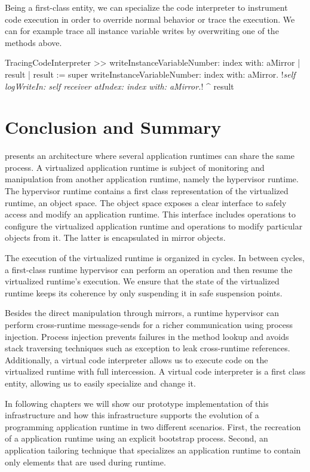 Being a first-class entity, we can specialize the code interpreter to instrument code execution in order to override normal behavior or trace the execution. We can for example trace all instance variable writes by overwriting one of the methods above.

\begin{code}
TracingCodeInterpreter >> writeInstanceVariableNumber: index with: aMirror
    | result |
    result := super writeInstanceVariableNumber: index with: aMirror.
    !\emph{self logWriteIn: self receiver atIndex: index with: aMirror.}!
    ^ result
\end{code}

\section{Conclusion and Summary}

\Vtt presents an architecture where several application runtimes can share the same process. A virtualized application runtime is subject of monitoring and manipulation from another application runtime, namely the hypervisor runtime. The hypervisor runtime contains a first class representation of the virtualized runtime, an object space. The object space exposes a clear interface to safely access and modify an application runtime. This interface includes operations to configure the virtualized application runtime and operations to modify particular objects from it. The latter is encapsulated in mirror objects.

The execution of the virtualized runtime is organized in cycles. In between cycles, a first-class runtime hypervisor can perform an operation and then resume the virtualized runtime's execution. We ensure that the state of the virtualized runtime keeps its coherence by only suspending it in safe suspension points.

Besides the direct manipulation through mirrors, a runtime hypervisor can perform cross-runtime message-sends for a richer communication using process injection. Process injection prevents failures in the method lookup and avoids stack traversing techniques such as exception to leak cross-runtime references. Additionally, a virtual code interpreter allows us to execute code on the virtualized runtime with full intercession. A virtual code interpreter is a first class entity, allowing us to easily specialize and change it.

In following chapters we will show our prototype implementation of this infrastructure and how this infrastructure supports the evolution of a programming application runtime in two different scenarios. First, the recreation of a application runtime using an explicit bootstrap process. Second, an application tailoring technique that specializes an application runtime to contain only elements that are used during runtime.


